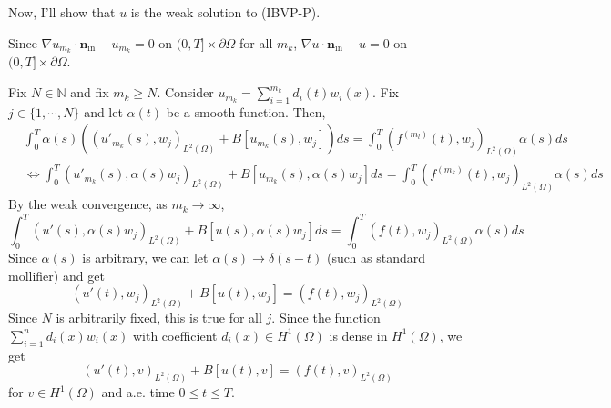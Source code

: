 \documentclass{article}
\begin{document}
\begin{enumerate}
Now, I'll show that $u$ is the weak solution to (IBVP-P). 

Since $\nabla u_{m_k}\cdot \bm{n}_{\text{in}}-u_{m_k}=0$ on $(0,T]\times \partial \Omega$ for all $m_k$, $\nabla u\cdot \bm{n}_{\text{in}}-u=0$ on $(0,T]\times \partial \Omega$.

Fix $N\in \mathbb{N}$ and fix $m_k\geq N$. Consider $u_{m_k}=\sum\limits_{i=1}^{m_k} d_i(t)w_i(x)$. Fix $j\in\{1,\cdots, N\}$ and let $\alpha(t)$ be a smooth function. Then,
\begin{equation*}
\begin{split}
&\int_0^T \alpha(s)\left((u'_{m_k}(s),w_j)_{L^2(\Omega)}+B[u_{m_k}(s),w_j]\right)ds=\int_0^T (f^{(m_l)}(t),w_j)_{L^2(\Omega)}\alpha(s)ds \\
&\Leftrightarrow \int_0^T (u'_{m_k}(s),\alpha(s)w_j)_{L^2(\Omega)}+B[u_{m_k}(s),\alpha(s)w_j]ds=\int_0^T (f^{(m_k)}(t),w_j)_{L^2(\Omega)}\alpha(s)ds
\end{split}
\end{equation*}
By the weak convergence, as $m_k\rightarrow \infty$,
\begin{equation*}
\int_0^T (u'(s),\alpha(s)w_j)_{L^2(\Omega)}+B[u(s),\alpha(s)w_j]ds=\int_0^T (f(t),w_j)_{L^2(\Omega)}\alpha(s)ds
\end{equation*}
Since $\alpha(s)$ is arbitrary, we can let $\alpha(s)\rightarrow \delta(s-t)$ (such as standard mollifier) and get
\begin{equation*}
(u'(t),w_j)_{L^2(\Omega)}+B[u(t),w_j]=(f(t),w_j)_{L^2(\Omega)}
\end{equation*}
Since $N$ is arbitrarily fixed, this is true for all $j$. Since the function $\sum\limits_{i=1}^n d_i(x)w_i(x)$ with coefficient $d_i(x)\in H^1(\Omega)$ is dense in $H^1(\Omega)$, we get
\begin{equation*}
(u'(t),v)_{L^2(\Omega)}+B[u(t),v]=(f(t),v)_{L^2(\Omega)}
\end{equation*}
for $v\in H^1(\Omega)$ and a.e. time $0\leq t\leq T$.


\end{enumerate}
\end{document}
